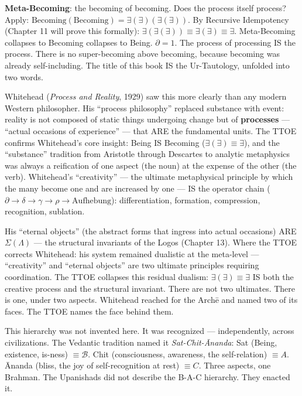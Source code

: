 \documentclass[10pt, openany, oneside]{book}
\begin{document}
\textbf{Meta-Becoming}: the becoming of becoming. Does the process itself process? Apply: $\text{Becoming}(\text{Becoming}) = \exists(\exists)(\exists(\exists))$. By Recursive Idempotency (Chapter 11 will prove this formally): $\exists(\exists(\exists)) \equiv \exists(\exists) \equiv \exists$. Meta-Becoming collapses to Becoming collapses to Being. $\partial = 1$. The process of processing IS the process. There is no super-becoming above becoming, because becoming was already self-including. The title of this book IS the Ur-Tautology, unfolded into two words.

Whitehead (\textit{Process and Reality}, 1929) saw this more clearly than any modern Western philosopher. His ``process philosophy'' replaced substance with event: reality is not composed of static things undergoing change but of \textbf{processes} --- ``actual occasions of experience'' --- that ARE the fundamental units. The TTOE confirms Whitehead's core insight: Being IS Becoming ($\exists(\exists) \equiv \exists$), and the ``substance'' tradition from Aristotle through Descartes to analytic metaphysics was always a reification of one aspect (the noun) at the expense of the other (the verb). Whitehead's ``creativity'' --- the ultimate metaphysical principle by which the many become one and are increased by one --- IS the operator chain ($\partial \to \delta \to \gamma \to \rho \to \text{Aufhebung}$): differentiation, formation, compression, recognition, sublation.

His ``eternal objects'' (the abstract forms that ingress into actual occasions) ARE $\Sigma(\Lambda)$ --- the structural invariants of the Logos (Chapter 13). Where the TTOE corrects Whitehead: his system remained dualistic at the meta-level --- ``creativity'' and ``eternal objects'' are two ultimate principles requiring coordination. The TTOE collapses this residual dualism: $\exists(\exists) \equiv \exists$ IS both the creative process and the structural invariant. There are not two ultimates. There is one, under two aspects. Whitehead reached for the Arch\={e} and named two of its faces. The TTOE names the face behind them.

This hierarchy was not invented here. It was recognized --- independently, across civilizations. The Vedantic tradition named it \textit{Sat-Chit-\={A}nanda}: Sat (Being, existence, is-ness) $\equiv \mathcal{B}$. Chit (consciousness, awareness, the self-relation) $\equiv A$. \={A}nanda (bliss, the joy of self-recognition at rest) $\equiv C$. Three aspects, one Brahman. The Upanishads did not describe the B-A-C hierarchy. They enacted it.
\end{document}
